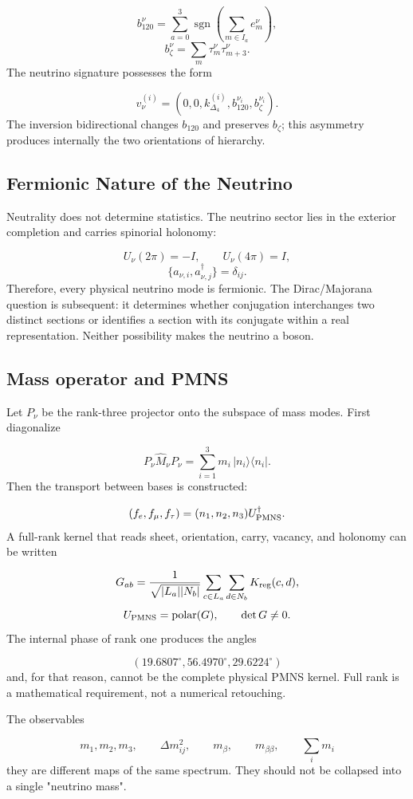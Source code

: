 \[
 b_{120}^\nu
 =\sum_{a=0}^{3}
 \operatorname{sgn}\!\left(\sum_{m\in I_a}e_m^\nu\right),
\]
\[
 b_\zeta^\nu=\sum_m\tau_m^\nu\tau_{m+3}^\nu.
\]
The neutrino signature possesses the form

\[
 v_\nu^{(i)}
 =(0,0,k_{\Delta_4}^{(i)},b_{120}^{\nu_i},b_\zeta^{\nu_i}).
\]
The inversion bidirectional changes \(b_{120}\) and preserves \(b_\zeta\); this asymmetry produces internally the two orientations of hierarchy.

\subsection{Fermionic Nature of the Neutrino}
Neutrality does not determine statistics. The neutrino sector lies in the exterior completion and carries spinorial holonomy:

\[
 U_\nu(2\pi)=-I,\qquad U_\nu(4\pi)=I,
\]
\[
 \{a_{\nu,i},a_{\nu,j}^\dagger\}=\delta_{ij}.
\]
Therefore, every physical neutrino mode is fermionic. The Dirac/Majorana question is subsequent: it determines whether conjugation interchanges two distinct sections or identifies a section with its conjugate within a real representation. Neither possibility makes the neutrino a boson.

\subsection{Mass operator and PMNS}
Let \(P_\nu\) be the rank-three projector onto the subspace of mass modes. First diagonalize

\[
 P_\nu\widehat M_\nu P_\nu
 =\sum_{i=1}^{3}m_i\,|n_i\rangle\langle n_i|.
\]
Then the transport between bases is constructed:

\[
 (f_e,f_\mu,f_\tau)
 =(n_1,n_2,n_3)U_{\rm PMNS}^\dagger.
\]
A full-rank kernel that reads sheet, orientation, carry, vacancy, and holonomy can be written

\[
 G_{ab}=
 \frac1{\sqrt{|L_a||N_b|}}
 \sum_{c\in L_a}\sum_{d\in N_b}K_{\rm reg}(c,d),
\]
\[
 U_{\rm PMNS}=\operatorname{polar}(G),
\qquad \det G\ne0.
\]
The internal phase of rank one produces the angles

\[
 (19.6807^\circ,56.4970^\circ,29.6224^\circ)
\]
and, for that reason, cannot be the complete physical PMNS kernel. Full rank is a mathematical requirement, not a numerical retouching.

The observables

\[
 m_1,m_2,m_3,\qquad
 \Delta m_{ij}^2,\qquad
 m_\beta,\qquad
 m_{\beta\beta},\qquad
 \sum_i m_i
\]
they are different maps of the same spectrum. They should not be collapsed into a single "neutrino mass".

